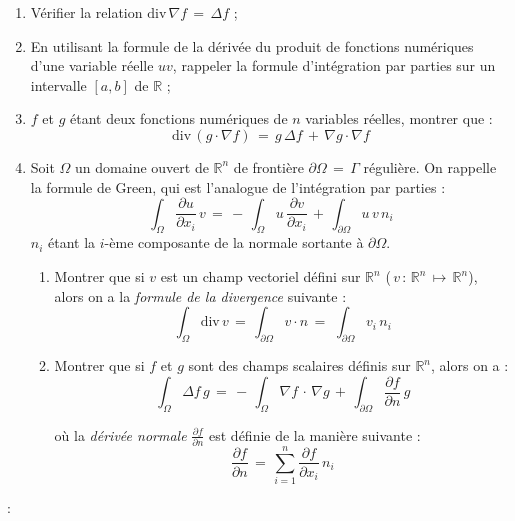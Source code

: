 \documentclass[leqno,11pt]{article}
\newcommand{\RR}{{\mathbb R}}
\newcommand{\ds}{\displaystyle}
\begin{document}
\begin{enumerate}
\item V\'erifier la relation $\ds \mbox{div} \, \nabla f \, = \, \Delta f$ ;
\item En utilisant la formule de la d\'eriv\'ee du produit de fonctions num\'eriques d'une variable r\'eelle $uv$, rappeler la formule d'int\'egration par parties sur un intervalle $[a,b]$ de $\RR$ ;
\item  $f$ et $g$ \'etant deux fonctions num\'eriques de $n$ variables r\'eelles, montrer que :
$$
\mbox{div}\, (g \cdot \nabla f) \, = \, g \, \Delta f \, + \, \nabla g \cdot \nabla f
$$
\item Soit $\Omega$ un domaine ouvert de $\ds \RR^n$ de fronti\`ere $\ds \partial \Omega \, = \, \Gamma$ r\'eguli\`ere. On rappelle la formule de Green, qui est l'analogue de l'int\'egration par parties :
$$
\int_\Omega \frac{\partial u}{\partial x_i} \, v \, = \, - \, \int_\Omega u \, \frac{\partial v}{\partial x_i} \, + \,\int_{\partial \Omega} u \,v \, n_i
$$
$\ds n_i$ \'etant la $i$-\`eme composante de la normale sortante \`a $\partial \Omega$.
\begin{enumerate}
\item Montrer que si $v$ est un champ vectoriel d\'efini sur $\ds \RR^n$ ($\, v \, : \, \RR^n \, \longmapsto \, \RR^n$), alors on a la {\sl formule de la divergence} suivante :
$$
\int_\Omega \mbox{div}  \, v \, =  \,\int_{\partial \Omega} v \cdot n \, = \,\,\int_{\partial \Omega} v_i \, n_i
$$
\item Montrer que si $f$ et $g$ sont des champs scalaires d\'efinis sur $\ds \RR^n$, alors on a :
$$
\int_\Omega \Delta f   \, g \, = \, - \, \int_\Omega \nabla f  \, \cdot \, \nabla g \,+ \, \int_{\partial \Omega} \frac{\partial f}{\partial n}  \, g
$$

o\`u la {\sl d\'eriv\'ee normale} $\ds \frac{\partial f}{\partial n} $ est d\'efinie de la mani\`ere suivante :
$$
\frac{\partial f}{\partial n} \, = \, \sum_{i=1}^n \frac{\partial f}{\partial x_i} \, n_i
$$
\end{enumerate}
\end{enumerate}


\vspace{0,5cm}

 : \\
\end{document}
